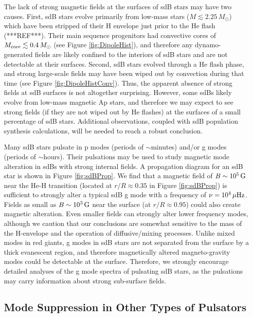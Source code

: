 The lack of strong magnetic fields at the surfaces of sdB stars may have two causes. First, sdB stars evolve primarily from low-mass stars ($M \lesssim 2.25 \, M_\odot$) which have been stripped of their H envelope just prior to the He flash (***REF***). Their main sequence progenitors had convective cores of $M_{\rm core} \lesssim 0.4 \, M_\odot$ (see Figure \ref{fig:DipoleHist}), and therefore any dynamo-generated fields are likely confined to the interiors of sdB stars and are not detectable at their surfaces. Second, sdB stars evolved through a He flash phase, and strong large-scale fields may have been wiped out by convection during that time (see Figure \ref{fig:DipoleHistConv}). Thus, the apparent absence of strong fields at sdB surfaces is not altogether surprising. However, some sdBs likely evolve from low-mass magnetic Ap stars, and therefore we may expect to see strong fields (if they are not wiped out by He flashes) at the surfaces of a small percentage of sdB stars. Additional observations, coupled with sdB population synthesis calculations, will be needed to reach a robust conclusion.

Many sdB stars pulsate in p modes (periods of $\sim$minutes) and/or g modes (periods of $\sim$hours). Their pulsations may be used to study magnetic mode alteration in sdBs with strong internal fields. A propagation diagram for an sdB star is shown in Figure \ref{fig:sdBProp}. We find that a magnetic field of $B\sim 10^5 \, {\rm G}$ near the He-H transition (located at $r/R \approx 0.35$ in Figure \ref{fig:sdBProp}) is sufficient to strongly alter a typical sdB g mode with a frequency of $\nu = 10^4 \, \mu {\rm Hz}$. Fields as small as $B\sim 10^3 \, {\rm G}$ near the surface (at $r/R \approx 0.95$) could also create magnetic alteration. Even smaller fields can strongly alter lower frequency modes, although we caution that our conclusions are somewhat sensitive to the mass of the H-envelope and the operation of diffusive/mixing processes. Unlike mixed modes in red giants, g modes in sdB stars are not separated from the surface by a thick evanescent region, and therefore magnetically altered magneto-gravity modes could be detectable at the surface. Therefore, we strongly encourage detailed analyses of the g mode spectra of pulsating sdB stars, as the pulsations may carry information about strong sub-surface fields. 



\subsection{Mode Suppression in Other Types of Pulsators}
  
